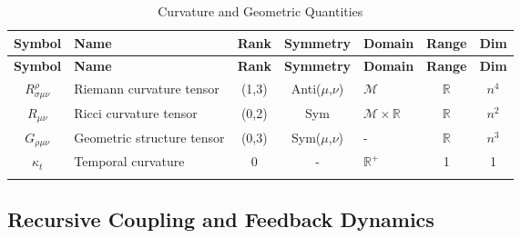 {\small
\renewcommand{\arraystretch}{1.1}
\begin{longtable}{|c|p{5.5cm}|c|c|p{1.8cm}|c|c|}
\hline
\textbf{Symbol} & \textbf{Name} & \textbf{Rank} & \textbf{Symmetry} & \textbf{Domain} & \textbf{Range} & \textbf{Dim} \\
\hline
\endfirsthead
\hline
\textbf{Symbol} & \textbf{Name} & \textbf{Rank} & \textbf{Symmetry} & \textbf{Domain} & \textbf{Range} & \textbf{Dim} \\
\hline
\endhead
\(R^{\rho}_{\sigma\mu\nu}\) & Riemann curvature tensor & (1,3) & Anti(\(\mu\),\(\nu\)) & \(\mathcal{M}\) & \(\mathbb{R}\) & \(n^4\) \\
\hline
\(R_{\mu\nu}\) & Ricci curvature tensor & (0,2) & Sym & \(\mathcal{M} \times \mathbb{R}\) & \(\mathbb{R}\) & \(n^2\) \\
\hline
\(G_{\rho\mu\nu}\) & Geometric structure tensor & (0,3) & Sym(\(\mu\),\(\nu\)) & - & \(\mathbb{R}\) & \(n^3\) \\
\hline
\(\kappa_t\) & Temporal curvature & 0 & - & \(\mathbb{R}^+\) & 1 & 1 \\
\hline
\caption{Curvature and Geometric Quantities}
\end{longtable}
}


\subsection{Recursive Coupling and Feedback Dynamics}
\label{2.2.3:recursive_coupling_and_feedback_dynamics}


